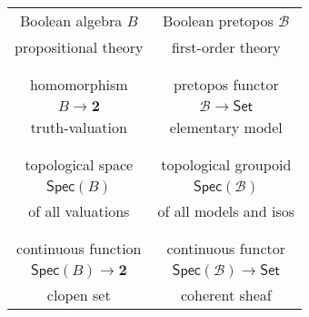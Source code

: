 \documentclass[graybox]{svmult}
\begin{document}
\begin{center}
\begin{tabular}{c|c}
Boolean algebra $B$ & Boolean pretopos $\mathcal{B}$ \\
propositional theory & first-order theory \\
\\
\hline\\
 homomorphism & pretopos functor\\
$B\to \mathbf{2}$ &  $\mathcal{B}\to \mathsf{Set}$ \\
truth-valuation & elementary model \\
\\
\hline\\
 topological space & topological groupoid \\
 $\mathsf{Spec}(B)$ & $\mathsf{Spec}(\mathcal{B})$ \\
of all valuations & of all models and isos \\
\\
\hline\\
 continuous function & continuous functor \\
$\mathsf{Spec}(B) \to \mathbf{2}$  & $\mathsf{Spec}(\mathcal{B}) \to \mathsf{Set}$\\
clopen set & coherent sheaf 
\end{tabular}
\end{center}

\end{document}

